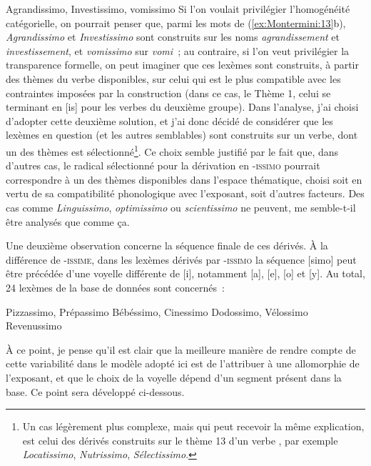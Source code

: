\documentclass[output=paper]{langsci/langscibook}
\begin{document}
        \ex \label{ex:Montermini:13b}  {Agrandissimo}, {Investissimo}, {vomissimo}
\z\z
Si l'on voulait privilégier l'homogénéité catégorielle, on pourrait
penser que, parmi les mots de (\ref{ex:Montermini:13}b), \emph{Agrandissimo} et
\emph{Investissimo} sont construits sur les noms \emph{agrandissement}
et \emph{investissement}, et \emph{vomissimo} sur \emph{vomi~}; au
contraire, si l'on veut privilégier la transparence formelle, on peut
imaginer que ces lexèmes sont construits, à partir des thèmes du verbe
disponibles, sur celui qui est le plus compatible avec les contraintes
imposées par la construction (dans ce cas, le Thème 1, celui se
terminant en {[}is{]} pour les verbes du deuxième groupe). Dans
l'analyse, j'ai choisi d'adopter cette deuxième solution, et j'ai donc
décidé de considérer que les lexèmes en question (et les autres
semblables) sont construits sur un verbe, dont un des thèmes est
sélectionné\footnote{Un cas légèrement plus complexe, mais qui peut
  recevoir la même explication, est celui des dérivés construits sur le
  thème 13 d'un verbe %
\citep[cf.][]{Bonami2009b}%
%
, par exemple
  \emph{Locatissimo}, \emph{Nutrissimo}, \emph{Sélectissimo}.}. Ce choix
semble justifié par le fait que, dans d'autres cas, le radical
sélectionné pour la dérivation en -\textsc{issimo} pourrait correspondre
à un des thèmes disponibles dans l'espace thématique, choisi soit en
vertu de sa compatibilité phonologique avec l'exposant, soit d'autres
facteurs. Des cas comme \emph{Linguissimo}, \emph{optimissimo} ou
\emph{scientissimo} ne peuvent, me semble-t-il être analysés que comme
ça.

Une deuxième observation concerne la séquence finale de ces dérivés. À
la différence de -\textsc{issime}, dans les lexèmes dérivés par
-\textsc{issimo} la séquence {[}simo{]} peut être précédée d'une voyelle
différente de {[}i{]}, notamment {[}a{]}, {[}e{]}, {[}o{]} et {[}y{]}.
Au total, 24 lexèmes de la base de données sont concernés~:

\ea \label{ex:Montermini:14}
  \ea \label{ex:Montermini:14a} {Pizzassimo}, {Prépassimo}
  \ex \label{ex:Montermini:14b}  {Bébéssimo}, {Cinessimo}
  \ex \label{ex:Montermini:14c}  {Dodossimo}, {Vélossimo}
  \ex \label{ex:Montermini:14d}  {Revenussimo}
\z\z


À ce point, je pense qu'il est clair que la meilleure manière de rendre
compte de cette variabilité dans le modèle adopté ici est de l'attribuer
à une allomorphie de l'exposant, et que le choix de la voyelle dépend
d'un segment présent dans la base. Ce point sera développé ci-dessous.
\end{document}
